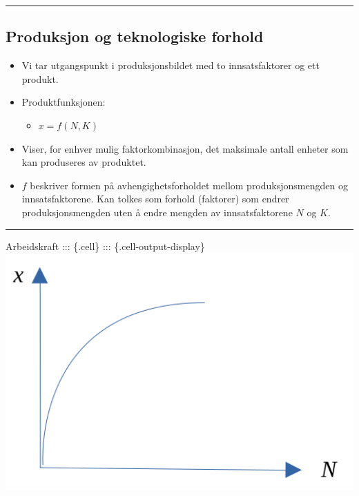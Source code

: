 \documentclass[
  letterpaper,
  DIV=11,
  numbers=noendperiod]{scrartcl}
\providecommand{\tightlist}{%
  \setlength{\itemsep}{0pt}\setlength{\parskip}{0pt}}\usepackage{longtable,booktabs,array}
\begin{document}
\begin{center}\rule{0.5\linewidth}{0.5pt}\end{center}

\subsection{Produksjon og teknologiske
forhold}\label{produksjon-og-teknologiske-forhold-1}

\begin{itemize}
\tightlist
\item
  Vi tar utgangspunkt i produksjonsbildet med to innsatsfaktorer og ett
  produkt.
\item
  Produktfunksjonen:

  \begin{itemize}
  \tightlist
  \item
    \(x = f(N, K)\)
  \end{itemize}
\item
  Viser, for enhver mulig faktorkombinasjon, det maksimale antall
  enheter som kan produseres av produktet.
\item
  \(f\) beskriver formen på avhengighetsforholdet mellom
  produksjonsmengden og innsatsfaktorene. Kan tolkes som forhold
  (faktorer) som endrer produksjonsmengden uten å endre mengden av
  innsatsfaktorene \(N\) og \(K\).
\end{itemize}

\begin{center}\rule{0.5\linewidth}{0.5pt}\end{center}

Arbeidskraft ::: \{.cell\} ::: \{.cell-output-display\}
\includegraphics[width=1\textwidth,height=\textheight]{drawio/prodkl.png}
\end{document}
